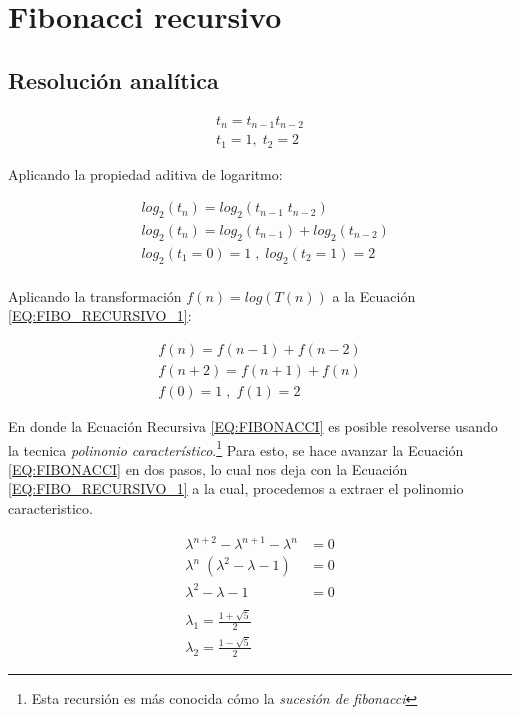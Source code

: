\section{Fibonacci recursivo}
\subsection{Resolución analítica}
\begin{align}
	t_n = t_{n-1}t_{n-2}\nonumber\\
	t_1 = 1 ,\; t_2=2 \nonumber 	
\end{align}

Aplicando la propiedad aditiva de logaritmo:

\begin{align}
	&log_2(t_n)=log_2(t_{n-1} \; t_{n-2}) \nonumber\\
	&log_2(t_n)=log_2(t_{n-1})+log_2(t_{n-2}) \label{EQ:FIBO_RECURSIVO_1}\\
	&log_2(t_1=0)=1 \;,\; log_2(t_2=1)=2 \nonumber\\
\end{align}

Aplicando la transformación $f(n) = log(T(n))$ a la Ecuación \ref{EQ:FIBO_RECURSIVO_1}:

\begin{align}
	f(n) = f(n-1) + f(n-2) \label{EQ:FIBONACCI} \\
	f(n+2) = f(n+1) + f(n) \label{EQ:FIBONACCI_DESPLAZADO}\\
	f(0) = 1 \;,\; f(1) = 2 \nonumber
\end{align}

En donde la Ecuación Recursiva \ref{EQ:FIBONACCI} es posible resolverse usando la tecnica \textit{polinonio característico}.\footnote{Esta recursión es más conocida cómo la \textit{sucesión de fibonacci}} Para esto, se hace avanzar la Ecuación \ref{EQ:FIBONACCI} en dos pasos, lo cual nos deja con la Ecuación \ref{EQ:FIBO_RECURSIVO_1} a la cual, procedemos a extraer el polinomio caracteristico.

\begin{align}
	\lambda^{n+2} - \lambda^{n+1} - \lambda^{n} &= 0 \nonumber\\
	\lambda^{n}\;(\lambda^{2} - \lambda - 1) &= 0 \label{EQ:POLINOMIO_FIBONACCI_1}\\	
	\lambda^{2} - \lambda - 1 &= 0 \label{EQ:POLINOMIO_FIBONACCI_SIMP}\\
	\nonumber\\
	\lambda_1 = \frac{1+\sqrt{5}}{2} \nonumber\\
	\lambda_2 = \frac{1-\sqrt{5}}{2} \nonumber
\end{align}

